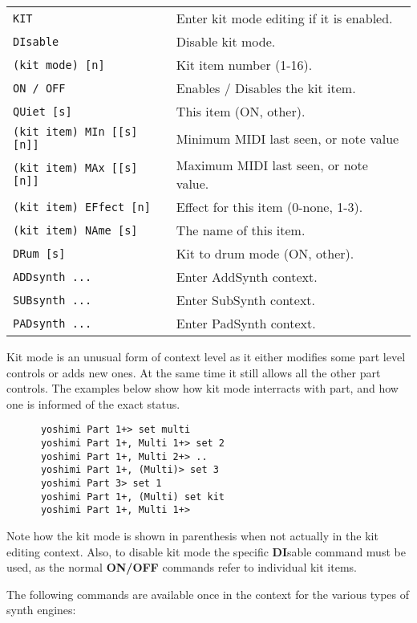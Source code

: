 \begin{table}[H]
\begin{tabular}{l l}
\texttt{KIT} &
   Enter kit mode editing if it is enabled. \\
\texttt{DIsable} &
   Disable kit mode. \\
   \texttt{(kit mode) [n]} &
      Kit item number (1-16). \\
   \texttt{ON / OFF} &
      Enables / Disables the kit item. \\
   \texttt{QUiet [s]} &
      This item (ON, {other}). \\
   \texttt{(kit item) MIn [[s][n]]} &
      Minimum MIDI last seen, or note value   \\
   \texttt{(kit item) MAx [[s][n]]} &
      Maximum MIDI last seen, or note value.   \\
   \texttt{(kit item) EFfect [n]} &
      Effect for this item (0-none, 1-3). \\
   \texttt{(kit item) NAme [s]} &
      The name of this item. \\
    \texttt{DRum [s]} &
      Kit to drum mode (ON, {other}). \\
\texttt{ADDsynth ...} &
   Enter AddSynth context. \\
\texttt{SUBsynth ...} &
   Enter SubSynth context. \\
\texttt{PADsynth ...} &
   Enter PadSynth context. \\
      \end{tabular}
   \end{table}

   Kit mode is an unusual form of context level as it either modifies some part level
   controls or adds new ones. At the same time it still allows all the other part
   controls. The examples below show how kit mode interracts with part, and how one is
   informed of the exact status.

   \begin{verbatim}
      yoshimi Part 1+> set multi
      yoshimi Part 1+, Multi 1+> set 2
      yoshimi Part 1+, Multi 2+> ..
      yoshimi Part 1+, (Multi)> set 3
      yoshimi Part 3> set 1
      yoshimi Part 1+, (Multi) set kit
      yoshimi Part 1+, Multi 1+>
   \end{verbatim}

   Note how the kit mode is shown in parenthesis when not actually in the kit editing
   context. Also, to disable kit mode the specific \textbf{DI}sable command must be
   used, as the normal \textbf{ON/OFF} commands refer to individual kit items.

   The following commands are available once in the context for the various types of
   synth engines:

